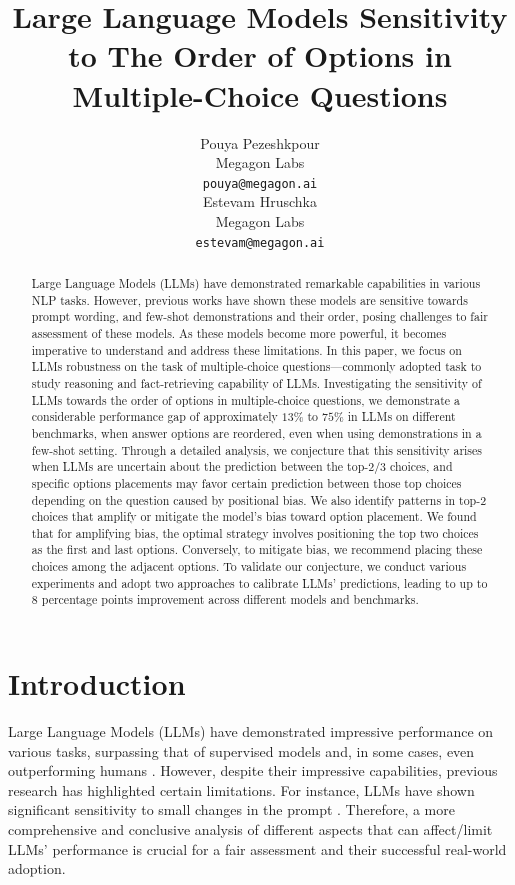 \documentclass[11pt]{article}
\title{%
Large Language Models Sensitivity to The Order of Options in Multiple-Choice Questions}
\author{Pouya Pezeshkpour \\
  Megagon Labs \\
  \texttt{pouya@megagon.ai} \\\And
  Estevam Hruschka\\
    Megagon Labs \\
  \texttt{estevam@megagon.ai}
}
\newcommand{\estevamc}[1]{\textcolor{purple}{Estevam: #1}}
\begin{document}
\maketitle
\begin{abstract}
Large Language Models (LLMs) have demonstrated remarkable capabilities in various NLP tasks. 
However, previous works have shown these models are sensitive towards prompt wording, and few-shot demonstrations and their order, posing challenges to fair assessment of these models. 
As these models become more powerful, it becomes imperative to understand and address these limitations.  
In this paper, we focus on LLMs robustness on the task of multiple-choice questions---commonly adopted task to study reasoning and fact-retrieving capability of LLMs. 
Investigating the sensitivity of LLMs towards the order of options in multiple-choice questions,  
we demonstrate a considerable performance gap of approximately $13\%$ to $75\%$ in LLMs on different benchmarks, when answer options are reordered, even when using demonstrations in a few-shot setting. 
Through a detailed analysis, we conjecture that this sensitivity arises when LLMs are uncertain about the prediction between the top-2/3 choices, and specific options placements may favor certain prediction between those top choices depending on the question caused by positional bias. 
We also identify patterns in top-2 choices that amplify or mitigate
the model's bias toward option placement. 
We found that for amplifying bias, the optimal strategy involves positioning the top two choices as the first and last options. Conversely, to mitigate bias, we recommend placing these choices among the adjacent options. 
To validate our conjecture, we conduct various experiments and adopt two approaches to calibrate LLMs' predictions, leading to up to $8$ percentage points improvement across different models and benchmarks. 
\end{abstract}

\section{Introduction}
Large Language Models (LLMs) have demonstrated impressive performance on various tasks, surpassing that of supervised models and, in some cases, even outperforming humans \citep{chowdhery2022palm,touvron2023llama,openai2023gpt-4}. 
However, despite their impressive capabilities, previous research has highlighted certain limitations. For instance, LLMs have shown significant sensitivity to small changes in the prompt \citep{zhao2021calibrate,wang2023adversarial,zhu2023promptbench}.  
Therefore, a more comprehensive and conclusive analysis of different aspects that can affect/limit LLMs' performance is crucial for a fair assessment and their successful real-world adoption.
\end{document}
